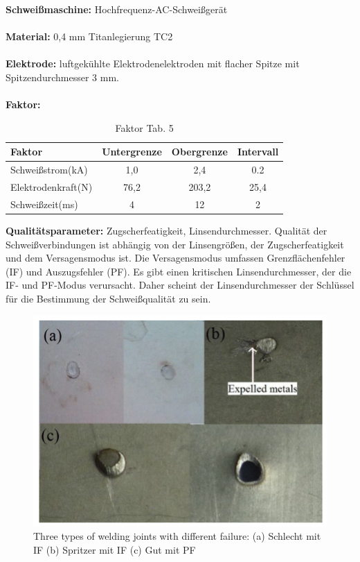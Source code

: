 \documentclass[english,ngerman]{tudscrreprt}
\begin{document}
\noindent
\textbf{Schweißmaschine: }Hochfrequenz-AC-Schweißgerät\\
\\
\textbf{Material: }0,4 mm Titanlegierung TC2\\
\\
\textbf{Elektrode: }luftgekühlte Elektrodenelektroden mit flacher Spitze mit Spitzendurchmesser 3 mm.\\
\\
\textbf{Faktor: }\\

\begin{table}[H]
\caption{Faktor Tab. 5}
\begin{flushleft}
	\begin{tabular}{lccc} 
		\toprule
 		\textbf{Faktor} & \textbf{Untergrenze} & \textbf{Obergrenze}&\textbf{Intervall}\\
		\midrule
		Schweißstrom(kA) & 1,0 & 2,4 & 0.2\\

		Elektrodenkraft(N) & 76,2 & 203,2 & 25,4\\

		Schweißzeit(ms) & 4  & 12 & 2\\
		\bottomrule
	\end{tabular}
\end{flushleft}
\end{table}
\noindent
\textbf{Qualitätsparameter: }Zugscherfeatigkeit, Linsendurchmesser.
Qualität der Schweißverbindungen ist abhängig von der Linsengrößen, der Zugscherfeatigkeit und dem Versagensmodus ist. Die Versagensmodus umfassen Grenzflächenfehler (IF) und Auszugsfehler (PF). Es gibt einen kritischen Linsendurchmesser, der die IF- und PF-Modus verursacht. Daher scheint der Linsendurchmesser der Schlüssel für die Bestimmung der Schweißqualität zu sein.
\begin{figure}[H]
\centering
\includegraphics[scale = 0.7]{./Bilder/Three types of welding joints with different failure.png}
\caption{Three types of welding joints with different failure: (a) Schlecht mit IF (b) Spritzer mit IF (c) Gut mit PF}\label{fgg:F}
\end{figure}
\end{document}
